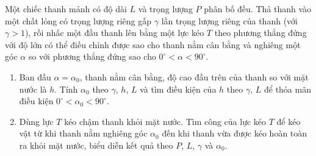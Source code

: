 Một chiếc thanh mảnh có độ dài $L$ và trọng lượng $P$ phân bố đều. Thả thanh vào một chất lỏng có trọng lượng riêng gấp $\gamma$ lần trọng lượng riêng của thanh (với $\gamma>1$), rồi nhấc một đầu thanh lên bằng một lực kéo $T$ theo phương thẳng đứng với độ lớn có thể điều chỉnh được sao cho thanh nằm cân bằng và nghiêng một góc $\alpha$ so với phương thẳng đứng sao cho $0^\circ<\alpha< 90^\circ$. 



\begin{center}
\end{center}

\begin{enumerate}[label=\textbf{\alph*,}]\itemsep0em
    \item Ban đầu $\alpha=\alpha_0$, thanh nằm cân bằng, độ cao đầu trên của thanh so với mặt nước là $h$. Tính $\alpha_0$ theo $\gamma$, $h$, $L$ và tìm điều kiện của $h$ theo $\gamma$, $L$ để thỏa mãn điều kiện $0^\circ < \alpha_0 < 90^\circ$.
    \item Dùng lực $T$ kéo chậm thanh khỏi mặt nước. Tìm công của lực kéo $T$ để kéo vật từ khi thanh nằm nghiêng góc $\alpha_0$ đến khi thanh vừa được kéo hoàn toàn ra khỏi mặt nước, biểu diễn kết quả theo $P$, $L$, $\gamma$ và $\alpha_0$.
\end{enumerate}


